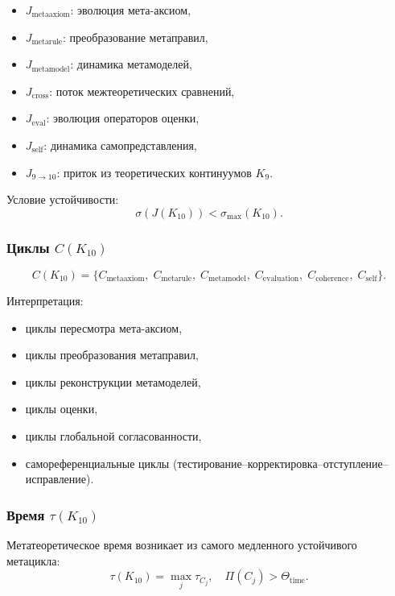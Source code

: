 \begin{itemize}
    \item $J_{\mathrm{metaaxiom}}$: эволюция мета-аксиом,
    \item $J_{\mathrm{metarule}}$: преобразование метаправил,
    \item $J_{\mathrm{metamodel}}$: динамика метамоделей,
    \item $J_{\mathrm{cross}}$: поток межтеоретических сравнений,
    \item $J_{\mathrm{eval}}$: эволюция операторов оценки,
    \item $J_{\mathrm{self}}$: динамика самопредставления,
    \item $J_{9\to10}$: приток из теоретических континуумов $K_9$.
\end{itemize}

Условие устойчивости:
\[
\sigma(J(K_{10})) < \sigma_{\max}(K_{10}).
\]

\subsubsection{Циклы $C(K_{10})$}

\[
C(K_{10})=
\{
C_{\mathrm{metaaxiom}},\;
C_{\mathrm{metarule}},\;
C_{\mathrm{metamodel}},\;
C_{\mathrm{evaluation}},\;
C_{\mathrm{coherence}},\;
C_{\mathrm{self}}
\}.
\]

Интерпретация:
\begin{itemize}
    \item циклы пересмотра мета-аксиом,
    \item циклы преобразования метаправил,
    \item циклы реконструкции метамоделей,
    \item циклы оценки,
    \item циклы глобальной согласованности,
    \item самореференциальные циклы (тестирование–корректировка–отступление–исправление).
\end{itemize}

\subsubsection{Время $\tau(K_{10})$}

Метатеоретическое время возникает из самого медленного устойчивого метацикла:
\[
\tau(K_{10}) = \max_j \tau_{C_j},
\quad
\Pi(C_j) > \Theta_{\mathrm{time}}.
\]

